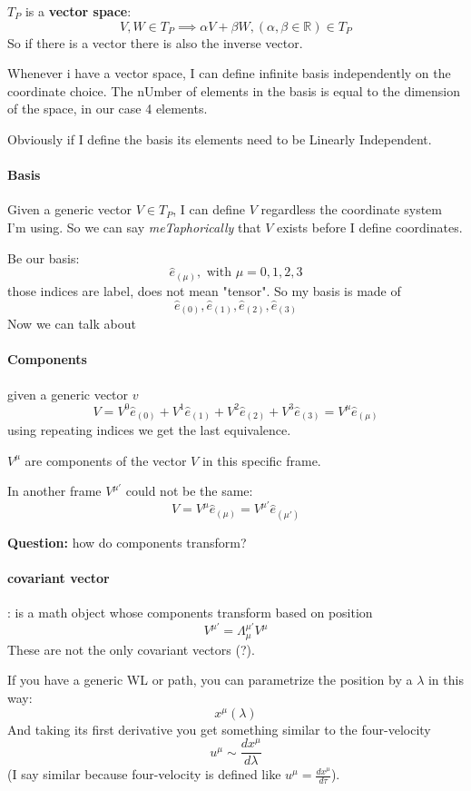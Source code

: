 \documentclass{report}
\begin{document}
$T_{P}$ is a \textbf{vector space}:
\[
	V,W \in T_{P} \implies \alpha V + \beta W, \left( \alpha , \beta \in \mathbb{R} \right) \in T_{P}
\]
So if there is a vector there is also the inverse vector.\par
Whenever i have a vector space, I can define infinite basis independently on the coordinate choice. The nUmber of elements in the basis is equal to the dimension of the space, in our case 4 elements.\par
Obviously if I define the basis its elements need to be Linearly Independent. 

\paragraph{Basis}
Given a generic vector $V \in T_{P}$, I can define $V$ regardless the coordinate system I'm using. So we can say \emph{meTaphorically} that $V$ exists before I define coordinates.\par

Be our basis:
\[
\hat{e}_{\left( \mu  \right)}, \text{ with } \mu = 0,1,2,3	
\]
those indices are label, does not mean "tensor". So my basis is made of \[
\hat{e}_{\left( 0 \right)}, \hat{e}_{\left( 1 \right)}, \hat{e}_{\left( 2 \right)}, \hat{e}_{\left( 3 \right)}
\]
Now we can talk about
\paragraph{Components}
given a generic vector $v$ 
\[
V = V^{0}\hat{e}_{\left( 0 \right)} + V^{1}\hat{e}_{\left( 1 \right)} + V^{2}\hat{e}_{\left( 2 \right)} + V^{3}\hat{e}_{\left( 3 \right)} =  V^{\mu }\hat{e}_{\left( \mu  \right) }
\]
using repeating indices we get the last equivalence.

$V^{\mu }$ are components of the vector $V$ in this specific frame. \par
In another frame $V^{\mu '}$ could not be the same:
\[
	V = V^{\mu }\hat{e}_{\left( \mu  \right)} = V^{\mu '}\hat{e}_{\left( \mu ' \right)}
\]

\textbf{Question:} how do components transform?
\paragraph{covariant vector}: is a math object whose components transform based on position
\[
V^{\mu '} = \Lambda^{\mu '}_{\mu }V^{\mu }
\]
These are not the only covariant vectors (?).

If you have a generic WL or path, you can parametrize the position by a $\lambda$ in this way:
\[
x^{\mu }\left( \lambda  \right)
\]
And taking its first derivative you get something similar to the four-velocity
\[
u^{\mu }\sim \frac{dx^{\mu }}{d\lambda }
\]
(I say similar because four-velocity is defined like $u^{\mu } = \frac{dx^{\mu }}{d\tau }$).
\end{document}
